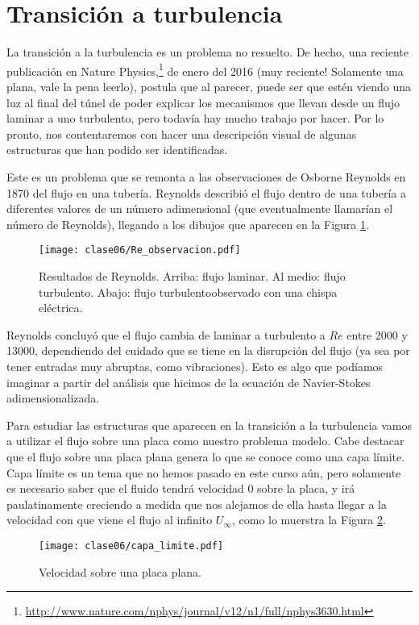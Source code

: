 \section*{Transición a turbulencia}

La transición a la turbulencia es un problema no resuelto.
De hecho, una reciente publicación en Nature Physics,\footnote{\url{http://www.nature.com/nphys/journal/v12/n1/full/nphys3630.html}} de enero del 2016 (muy reciente! Solamente una plana, vale la pena leerlo), postula que al parecer, puede ser que estén viendo una luz al final del túnel de poder explicar los mecanismos que llevan desde un flujo laminar a uno turbulento, pero todavía hay mucho trabajo por hacer.
Por lo pronto, nos contentaremos con hacer una descripción visual de algunas estructuras que han podido ser identificadas.

Este es un problema que se remonta a las observaciones de Osborne Reynolds en 1870 del flujo en una tubería.
Reynolds describió el flujo dentro de una tubería a diferentes valores de un número adimensional (que eventualmente llamarían el número de Reynolds), llegando a los dibujos que aparecen en la Figura \ref{fig:Re_observacion}.
%
\begin{figure}[h!]
\centering
\texttt{[image: clase06/Re\_observacion.pdf]}
\caption{Resultados de Reynolds. Arriba: flujo laminar. Al medio: flujo turbulento. Abajo: flujo turbulentoobservado con una chispa eléctrica.}
\label{fig:Re_observacion}
\end{figure}

Reynolds concluyó que el flujo cambia de laminar a turbulento a $Re$ entre 2000 y 13000, dependiendo del cuidado que se tiene en la disrupción del flujo (ya sea por tener entradas muy abruptas, como vibraciones).
Esto es algo que podíamos imaginar a partir del análisis que hicimos de la ecuación de Navier-Stokes adimensionalizada.

Para estudiar las estructuras que aparecen en la transición a la turbulencia vamos a utilizar el flujo sobre una placa como nuestro problema modelo.
Cabe destacar que el flujo sobre una placa plana genera lo que se conoce como una capa límite. 
Capa límite es un tema que no hemos pasado en este curso aún, pero solamente es necesario saber que el fluido tendrá velocidad 0 sobre la placa, y irá paulatinamente creciendo a medida que nos alejamos de ella hasta llegar a la velocidad con que viene el flujo al infinito $U_\infty$, como lo muerstra la Figura \ref{fig:capa_limite}.
%
\begin{figure}[h!]
\centering
\texttt{[image: clase06/capa\_limite.pdf]}
\caption{Velocidad sobre una placa plana.}
\label{fig:capa_limite}
\end{figure}

